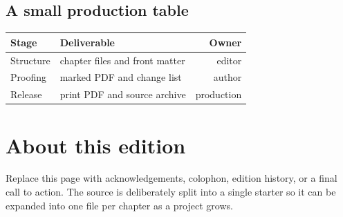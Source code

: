 \documentclass[11pt,twoside,openright]{memoir}
\begin{document}
\section{A small production table}
\begin{center}
\begin{tabular}{llr}
\toprule Stage & Deliverable & Owner\\\midrule
Structure & chapter files and front matter & editor\\
Proofing & marked PDF and change list & author\\
Release & print PDF and source archive & production\\
\bottomrule
\end{tabular}
\end{center}
\backmatter
\chapter*{About this edition}
Replace this page with acknowledgements, colophon, edition history, or a final
call to action. The source is deliberately split into a single starter so it
can be expanded into one file per chapter as a project grows.
\end{document}
